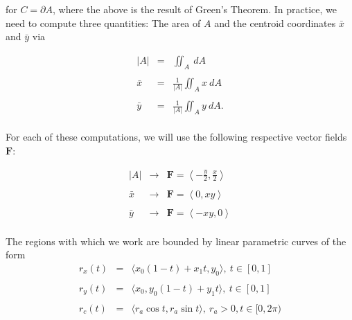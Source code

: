 \documentclass{article}
\begin{document}
\noindent
for $C = \partial A$, where the above is the result of Green's Theorem. In practice, we need to compute three quantities: The area of $A$ and the centroid coordinates $\bar{x}$ and $\bar{y}$ via

\[
\begin{array}{rcl}
        |A| &=& \displaystyle \iint_A \: dA \\
            & & \\
    \bar{x} &=& \displaystyle
                \frac{1}{|A|} \iint_A x \: dA \\
            & & \\
    \bar{y} &=& \displaystyle
                \frac{1}{|A|} \iint_A y \: dA. \\
\end{array}
\]

\noindent
For each of these computations, we will use the following respective vector fields $\mathbf{F}$:

\[
\begin{array}{rcl}
        |A| &\rightarrow&	\displaystyle
                            \mathbf{F} =
                            \left\langle
                                -\frac{y}{2}, \frac{x}{2}
                            \right\rangle \\
            & & \\
    \bar{x} &\rightarrow&	\displaystyle
                            \mathbf{F} =
                            \left\langle
                                0, xy
                            \right\rangle \\
            & & \\
    \bar{y} &\rightarrow&	\displaystyle
                            \mathbf{F} =
                            \left\langle
                                -xy, 0
                            \right\rangle \\
\end{array}
\]

\noindent
The regions with which we work are bounded by linear parametric curves of the form
\[
    \begin{array}{rcl}
        r_x(t)	&=&	\displaystyle
                    \langle
                        x_0 (1 - t) + x_1t, y_0
                    \rangle, \:
                    t \in [0,1]
                    \\
                & &	\\
        r_y(t)	&=&	\displaystyle
                    \langle
                        x_0, y_0 (1 - t) + y_1t
                    \rangle, \:
                    t \in [0,1]
                    \\
                & &	\\
        r_c(t)	&=&	\displaystyle
                    \langle
                        r_a \cos t, r_a \sin t
                    \rangle, \: r_a > 0, t \in [0, 2\pi) \\
                & &	\\
    \end{array}
\]
\end{document}
